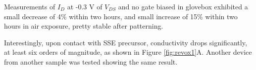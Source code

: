 Measurements of $I_{D}$ at -0.3 V of $V_{DS}$ and no gate biased in glovebox exhibited a small decrease of 4\% within two hours, and small increase of 15\% within two hours in air exposure, pretty stable after patterning.

Interestingly, upon contact with SSE precursor, conductivity drops significantly, at least six orders of magnitude, as shown in Figure \ref{fig:revox1}A. Another device from another sample was tested showing the same result. 

